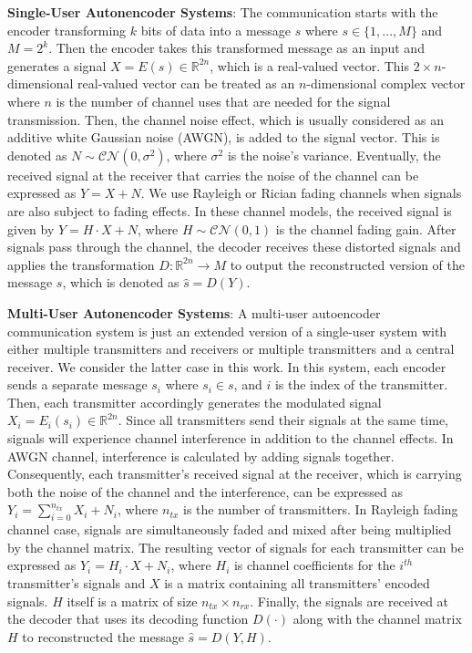 \textbf{Single-User Autonencoder Systems}: The communication starts with the encoder transforming \(k\) bits of data into a message \(s\) where \(s \in \{1,...,M\}\) and \(M = 2^k\). Then the encoder takes this transformed message as an input and generates a signal \(X = E(s) \in \mathbb{R}^{2n}\), which is a real-valued vector. This \(2 \times n\)-dimensional real-valued vector can be treated as an \(n\)-dimensional complex vector where \(n\) is the number of channel uses that are needed for the signal transmission. Then, the channel noise effect, which is usually considered as an additive white Gaussian noise (AWGN), is added to the signal vector. This is denoted as \(N \sim \mathcal{CN}(0, \sigma^2)\), where \(\sigma^2\) is the noise's variance. Eventually, the received signal at the receiver that carries the noise of the channel can be expressed as \(Y = X + N\). We use Rayleigh or Rician fading channels when signals are also subject to fading effects. In these channel models, the received signal is given by \(Y = H \cdot X + N\), where \(H \sim \mathcal{CN}(0, 1)\) is the channel fading gain. After signals pass through the channel, the decoder receives these distorted signals and applies the transformation \(D: \mathbb{R}^{2n} \rightarrow M \) to output the reconstructed version of the message \(s\), which is  denoted as \(\hat{s} = D(Y)\).

\textbf{Multi-User Autonencoder Systems}: A multi-user autoencoder communication system is just an extended version of a single-user system with either multiple transmitters and receivers or multiple transmitters and a central receiver. We consider the latter case in this work. In this system, each encoder sends a separate message \(s_i\) where \(s_i \in s\), and \(i\) is the index of the transmitter. Then, each transmitter accordingly generates the modulated signal \(X_i = E_i(s_i) \in \mathbb{R}^{2n}\). Since all transmitters send their signals at the same time, signals will experience channel interference in addition to the channel effects. In AWGN channel, interference is calculated by adding signals together. Consequently, each transmitter's received signal at the receiver, which is carrying both the noise of the channel and the interference, can be expressed as \(Y_i = \sum_{i=0}^{n_{tx}}X_i + N_i\), where \(n_{tx}\) is the number of transmitters. In Rayleigh fading channel case, signals are simultaneously faded and mixed after being multiplied by the channel matrix. The resulting vector of signals for each transmitter can be expressed as \(Y_i = H_i \cdot X + N_i\), where \(H_i\) is channel coefficients for the \(i^{th}\) transmitter's signals and \(X\) is a matrix containing all transmitters' encoded signals. \(H\) itself is a matrix of size \(n_{tx} \times n_{rx}\). Finally, the signals are received at the decoder that uses its decoding function \(D(\cdot)\) along with the channel matrix \(H\) to reconstructed the message \(\hat{s} = D(Y, H)\).

